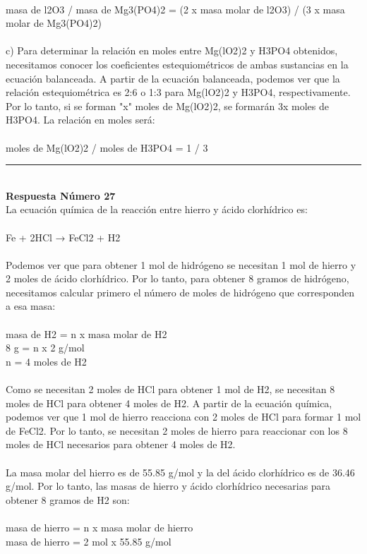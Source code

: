 \documentclass{article}
\begin{document}
\\
masa de l2O3 / masa de Mg3(PO4)2 = (2 x masa molar de l2O3) / (3 x masa molar de Mg3(PO4)2)\\
\\
c) Para determinar la relación en moles entre Mg(lO2)2 y H3PO4 obtenidos, necesitamos conocer los coeficientes estequiométricos de ambas sustancias en la ecuación balanceada. A partir de la ecuación balanceada, podemos ver que la relación estequiométrica es 2:6 o 1:3 para Mg(lO2)2 y H3PO4, respectivamente. Por lo tanto, si se forman "x" moles de Mg(lO2)2, se formarán 3x moles de H3PO4. La relación en moles será:\\
\\
moles de Mg(lO2)2 / moles de H3PO4 = 1 / 3\\
\noindent\rule{\textwidth}{1pt} \\
\textbf{Respuesta Número 27} \\
La ecuación química de la reacción entre hierro y ácido clorhídrico es:\\
\\
Fe + 2HCl → FeCl2 + H2\\
\\
Podemos ver que para obtener 1 mol de hidrógeno se necesitan 1 mol de hierro y 2 moles de ácido clorhídrico. Por lo tanto, para obtener 8 gramos de hidrógeno, necesitamos calcular primero el número de moles de hidrógeno que corresponden a esa masa:\\
\\
masa de H2 = n x masa molar de H2\\
8 g = n x 2 g/mol\\
n = 4 moles de H2\\
\\
Como se necesitan 2 moles de HCl para obtener 1 mol de H2, se necesitan 8 moles de HCl para obtener 4 moles de H2. A partir de la ecuación química, podemos ver que 1 mol de hierro reacciona con 2 moles de HCl para formar 1 mol de FeCl2. Por lo tanto, se necesitan 2 moles de hierro para reaccionar con los 8 moles de HCl necesarios para obtener 4 moles de H2. \\
\\
La masa molar del hierro es de 55.85 g/mol y la del ácido clorhídrico es de 36.46 g/mol. Por lo tanto, las masas de hierro y ácido clorhídrico necesarias para obtener 8 gramos de H2 son:\\
\\
masa de hierro = n x masa molar de hierro\\
masa de hierro = 2 mol x 55.85 g/mol\\
\end{document}
